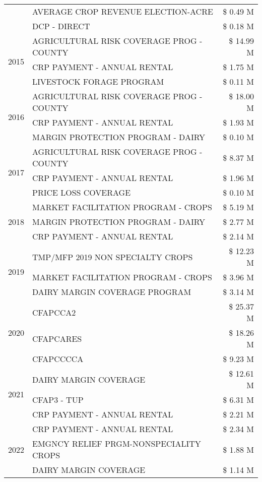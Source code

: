\begin{tabular}{llr}
 & AVERAGE CROP REVENUE ELECTION-ACRE & \$ 0.49 M \\
 & DCP - DIRECT & \$ 0.18 M \\
\cline{1-3}
\multirow[t]{3}{*}{2015} & AGRICULTURAL RISK COVERAGE PROG - COUNTY & \$ 14.99 M \\
 & CRP PAYMENT - ANNUAL RENTAL & \$ 1.75 M \\
 & LIVESTOCK FORAGE PROGRAM & \$ 0.11 M \\
\cline{1-3}
\multirow[t]{3}{*}{2016} & AGRICULTURAL RISK COVERAGE PROG - COUNTY & \$ 18.00 M \\
 & CRP PAYMENT - ANNUAL RENTAL & \$ 1.93 M \\
 & MARGIN PROTECTION PROGRAM - DAIRY & \$ 0.10 M \\
\cline{1-3}
\multirow[t]{3}{*}{2017} & AGRICULTURAL RISK COVERAGE PROG - COUNTY & \$ 8.37 M \\
 & CRP PAYMENT - ANNUAL RENTAL & \$ 1.96 M \\
 & PRICE LOSS COVERAGE & \$ 0.10 M \\
\cline{1-3}
\multirow[t]{3}{*}{2018} & MARKET FACILITATION PROGRAM - CROPS & \$ 5.19 M \\
 & MARGIN PROTECTION PROGRAM - DAIRY & \$ 2.77 M \\
 & CRP PAYMENT - ANNUAL RENTAL & \$ 2.14 M \\
\cline{1-3}
\multirow[t]{3}{*}{2019} & TMP/MFP 2019 NON SPECIALTY CROPS & \$ 12.23 M \\
 & MARKET FACILITATION PROGRAM - CROPS & \$ 3.96 M \\
 & DAIRY MARGIN COVERAGE PROGRAM & \$ 3.14 M \\
\cline{1-3}
\multirow[t]{3}{*}{2020} & CFAPCCA2 & \$ 25.37 M \\
 & CFAPCARES & \$ 18.26 M \\
 & CFAPCCCCA & \$ 9.23 M \\
\cline{1-3}
\multirow[t]{3}{*}{2021} & DAIRY MARGIN COVERAGE & \$ 12.61 M \\
 & CFAP3 - TUP & \$ 6.31 M \\
 & CRP PAYMENT - ANNUAL RENTAL & \$ 2.21 M \\
\cline{1-3}
\multirow[t]{3}{*}{2022} & CRP PAYMENT - ANNUAL RENTAL & \$ 2.34 M \\
 & EMGNCY RELIEF PRGM-NONSPECIALITY CROPS & \$ 1.88 M \\
 & DAIRY MARGIN COVERAGE & \$ 1.14 M \\
\cline{1-3}
\bottomrule
\end{tabular}

